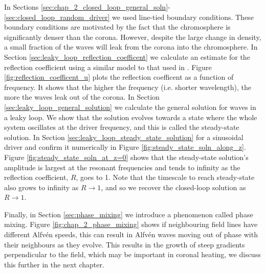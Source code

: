 In Sections \ref{sec:chap_2_closed_loop_general_soln}-\ref{sec:closed_loop_random_driver} we used line-tied boundary conditions. These boundary conditions are motivated by the fact that the chromosphere is significantly denser than the corona. However, despite the large change in density, a small fraction of the waves will leak from the corona into the chromosphere. In Section \ref{sec:leaky_loop_reflection_coefficent} we calculate an estimate for the reflection coefficient using a similar model to that used in \citet{Hollweg1984b}. Figure \ref{fig:reflection_coefficent_u} plots the reflection coefficent as a function of frequency. It shows that the higher the frequency (i.e. shorter wavelength), the more the waves leak out of the corona. In Section \ref{sec:leaky_loop_general_solution} we calculate the general solution for waves in a leaky loop. We show that the solution evolves towards a state where the whole system oscillates at the driver frequency, and this is called the steady-state solution. In Section \ref{sec:leaky_loop_steady_state_solution} for a sinusoidal driver and confirm it numerically in Figure \ref{fig:steady_state_soln_along_z}. Figure \ref{fig:steady_state_soln_at_z=0} shows that the steady-state solution's amplitude is largest at the resonant frequencies and tends to infinity as the reflection coefficient, $R$, goes to 1. Note that the timescale to reach steady-state also grows to infinity as $R\rightarrow 1$, and so we recover the closed-loop solution as $R\rightarrow 1$.

Finally, in Section \ref{sec:phase_mixing} we introduce a phenomenon called phase mixing. Figure \ref{fig:chap_2_phase_mixing} shows if neighbouring field lines have different Alfv\'en speeds, this can result in Alfv\'en waves moving out of phase with their neighbours as they evolve. This results in the growth of steep gradients perpendicular to the field, which may be important in coronal heating, we discuss this further in the next chapter.

